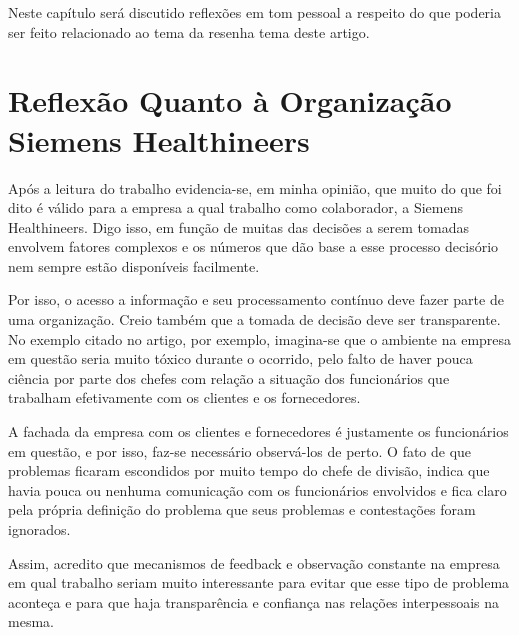 Neste capítulo será discutido reflexões em tom pessoal a respeito do que 
poderia ser feito relacionado ao tema da resenha tema deste artigo.

\section{Reflexão Quanto à Organização Siemens Healthineers}

Após a leitura do trabalho evidencia-se, em minha opinião, que muito
do que foi dito é válido para a empresa a qual trabalho como colaborador,
a Siemens Healthineers. Digo isso, em função de muitas das decisões
a serem tomadas envolvem fatores complexos e os números que dão base
a esse processo decisório nem sempre estão disponíveis facilmente.

Por isso, o acesso a informação e seu processamento contínuo deve
fazer parte de uma organização. Creio também que a tomada de decisão
deve ser transparente. No exemplo citado no artigo, por exemplo, imagina-se
que o ambiente na empresa em questão seria muito tóxico durante o
ocorrido, pelo falto de haver pouca ciência por parte dos chefes com
relação a situação dos funcionários que trabalham efetivamente com
os clientes e os fornecedores. 

A fachada da empresa com os clientes e fornecedores é justamente os
funcionários em questão, e por isso, faz-se necessário observá-los
de perto. O fato de que problemas ficaram escondidos por muito tempo
do chefe de divisão, indica que havia pouca ou nenhuma comunicação
com os funcionários envolvidos e fica claro pela própria definição
do problema que seus problemas e contestações foram ignorados. 

Assim, acredito que mecanismos de feedback e observação constante
na empresa em qual trabalho seriam muito interessante para evitar
que esse tipo de problema aconteça e para que haja transparência e
confiança nas relações interpessoais na mesma.
